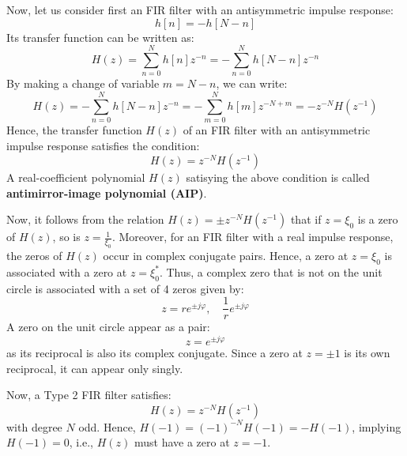 \documentclass[../../main/main.tex]{subfiles}
\begin{document}
\medskip
Now, let us consider first an FIR filter with an antisymmetric impulse response:
\begin{equation}
    h[n]
    =
    -h[N-n]
    \label{eq:L20_S45_1}
\end{equation}
Its transfer function can be written as:
\begin{equation}
    H(z)
    =
    \sum_{n=0}^{N} h[n]z^{-n}
    =
    - \sum_{n=0}^{N} h[N-n]z^{-n}
    \label{eq:L20_S45_2}
\end{equation}
By making a change of variable \( m = N - n \), we can write:
\begin{equation}
    H(z)
    =
    - \sum_{n=0}^{N} h[N-n]z^{-n}
    =
    - \sum_{m=0}^{N} h[m]z^{-N+m}
    =
    - z^{-N} H(z^{-1})
    \label{eq:L20_S45_3}
\end{equation}
Hence, the transfer function \( H(z) \) of an FIR filter with an antisymmetric impulse response satisfies the condition:
\begin{equation}
    H(z)
    =
    z^{-N} H(z^{-1})
    \label{eq:L20_S46_1}
\end{equation}
%
A real-coefficient polynomial \( H(z) \) satisying the above condition is called \textbf{antimirror-image polynomial (AIP)}.

Now, it follows from the relation \( H(z) = \pm z^{-N} H(z^{-1}) \) that if \( z = \xi_{0} \) is a zero of \( H(z) \), so is \( z = \frac{1}{\xi_{0}} \). Moreover, for an FIR filter with a real impulse response, the zeros of \( H(z) \) occur in complex conjugate pairs. Hence, a zero at \( z = \xi_{0} \) is associated with a zero at \( z = \xi^{*}_{0} \).
Thus, a complex zero that is not on the unit circle is associated with a set of 4 zeros given by:%
\begin{equation}
    z
    =
    re^{\pm j \varphi},
    \quad
    \frac{1}{r} e^{\pm j \varphi}
    \label{eq:L20_S48_1}
\end{equation}
A zero on the unit circle appear as a pair:
\begin{equation}
    z
    =
    e^{\pm j \varphi}
    \label{eq:L20_S48_2}
\end{equation}
as its reciprocal is also its complex conjugate. Since a zero at \( z = \pm 1 \) is its own reciprocal, it can appear only singly.

Now, a Type 2 FIR filter satisfies:
\begin{equation}
    H(z)
    =
    z^{-N} H(z^{-1})
    \label{eq:L20_S49_1}
\end{equation}
with degree \( N \) odd. Hence, \( H(-1) = (-1)^{-N} H(-1) = - H(-1) \), implying \( H(-1) = 0 \), i.e., \( H(z) \) must have a zero at \( z = -1 \).
\end{document}
